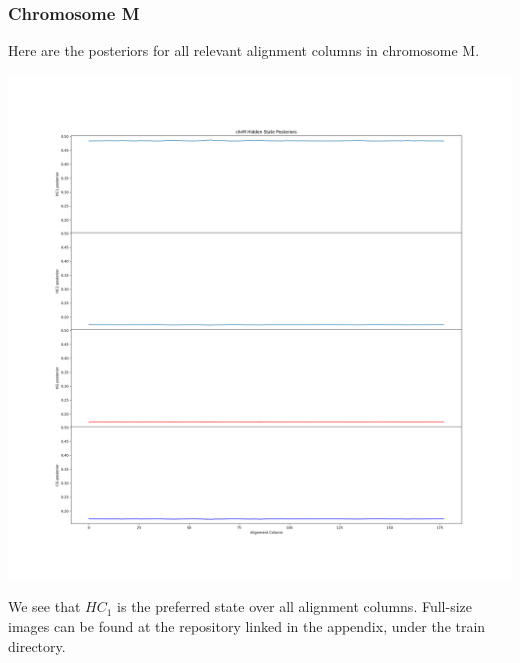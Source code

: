\documentclass[12pt]{article}
\begin{document}
        \subsubsection{Chromosome M}
        Here are the posteriors for all relevant alignment columns in chromosome M.
        {\centering\includegraphics[width=1.\textwidth]{train/chrM_posteriors}\par}
        We see that $HC_1$ is the preferred state over all alignment columns. Full-size images can be found at the repository linked in the appendix, under the train directory.
\end{document}
